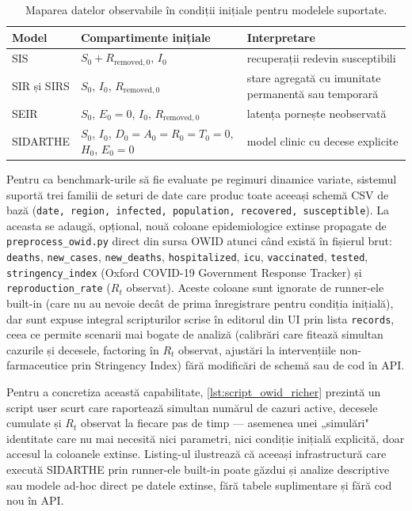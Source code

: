 \begin{table}[t]
\centering
\caption[Inițializarea compartimentelor]{Maparea datelor observabile în condiții inițiale pentru modelele suportate.}
\label{tab:initializare_modele}
\begin{tabularx}{0.95\textwidth}{lXX}
\toprule
\textbf{Model} & \textbf{Compartimente inițiale} & \textbf{Interpretare} \\
\midrule
SIS & $S_0 + R_{\text{removed},0}$, $I_0$ & recuperații redevin susceptibili \\
SIR și SIRS & $S_0$, $I_0$, $R_{\text{removed},0}$ & stare agregată cu imunitate permanentă sau temporară \\
SEIR & $S_0$, $E_0=0$, $I_0$, $R_{\text{removed},0}$ & latența pornește neobservată \\
SIDARTHE & $S_0$, $I_0$, $D_0=A_0=R_0=T_0=0$, $H_0$, $E_0=0$ & model clinic cu decese explicite \\
\bottomrule
\end{tabularx}
\end{table}

Pentru ca benchmark-urile să fie evaluate pe regimuri dinamice variate, sistemul
suportă trei familii de seturi de date care produc toate aceeași schemă CSV
de bază (\texttt{date, region, infected, population, recovered, susceptible}).
La aceasta se adaugă, opțional, nouă coloane epidemiologice extinse propagate
de \texttt{preprocess\_owid.py} direct din sursa OWID atunci când există în
fișierul brut: \texttt{deaths}, \texttt{new\_cases}, \texttt{new\_deaths},
\texttt{hospitalized}, \texttt{icu}, \texttt{vaccinated}, \texttt{tested},
\texttt{stringency\_index} (Oxford COVID-19 Government Response Tracker) și
\texttt{reproduction\_rate} ($R_t$ observat). Aceste coloane sunt ignorate de
runner-ele built-in (care nu au nevoie decât de prima înregistrare pentru
condiția inițială), dar sunt expuse integral scripturilor scrise în editorul
din UI prin lista \texttt{records}, ceea ce permite scenarii mai bogate de
analiză (calibrări care fitează simultan cazurile și decesele, factoring în
$R_t$ observat, ajustări la intervențiile non-farmaceutice prin Stringency
Index) fără modificări de schemă sau de cod în API.

Pentru a concretiza această capabilitate, \cref{lst:script_owid_richer}
prezintă un script user scurt care raportează simultan numărul de cazuri
active, decesele cumulate și $R_t$ observat la fiecare pas de timp ---
asemenea unei „simulări" identitate care nu mai necesită nici parametri,
nici condiție inițială explicită, doar accesul la coloanele extinse.
Listing-ul ilustrează că aceeași infrastructură care execută SIDARTHE prin
runner-ele built-in poate găzdui și analize descriptive sau modele ad-hoc
direct pe datele extinse, fără tabele suplimentare și fără cod nou în API.

